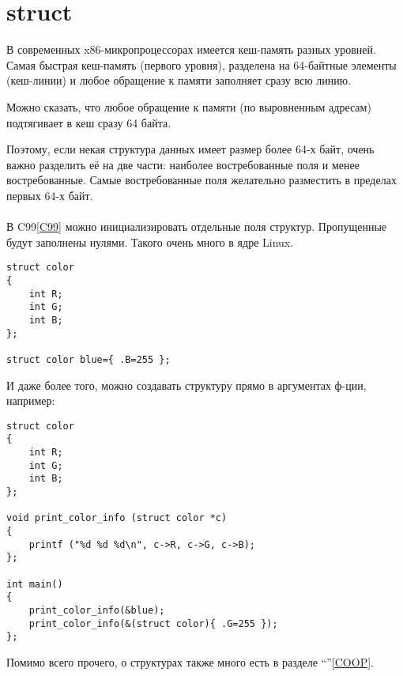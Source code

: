 ﻿\section{struct}

В современных x86-микропроцессорах имеется кеш-память разных уровней. 
Самая быстрая кеш-память (первого уровня),
разделена на 64-байтные элементы (кеш-линии) и любое обращение к памяти заполняет сразу всю линию.

Можно сказать, что любое обращение к памяти (по выровненным адресам) подтягивает в кеш сразу 64 байта.

Поэтому, если некая структура данных имеет размер более 64-х байт, очень важно разделить её на две части:
наиболее востребованные поля и менее востребованные. 
Самые востребованные поля желательно разместить в пределах первых 64-х байт. \\
\\
В C99\ref{C99} можно инициализировать отдельные поля структур. Пропущенные будут заполнены нулями. Такого очень
много в ядре Linux. 

\begin{lstlisting}
struct color
{
	int R;
	int G;
	int B;
};

struct color blue={ .B=255 };
\end{lstlisting}


И даже более того, можно создавать структуру прямо в аргументах ф-ции, например:

\begin{lstlisting}
struct color
{
	int R;
	int G;
	int B;
};

void print_color_info (struct color *c)
{
	printf ("%d %d %d\n", c->R, c->G, c->B);
};

int main()
{
	print_color_info(&blue);
	print_color_info(&(struct color){ .G=255 });
};
\end{lstlisting}

Помимо всего прочего, о структурах также много есть в разделе ``\COOPname''\ref{COOP}.

